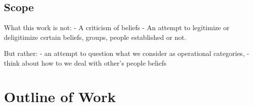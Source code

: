 \subsection{Scope}
What this work is not:
- A criticism of beliefs
- An attempt to legitimize or deligitimize certain beliefs, groups, people established or not.

But rather:
- an attempt to question what we consider as operational categories,
- think about how to we deal with other's people beliefs

\section{Outline of Work}
